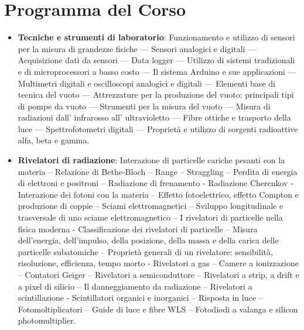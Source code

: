 \documentclass[12pt, letterpaper]{book}
\begin{document}
\chapter*{Programma del Corso}
\begin{itemize}
    \item[1] \textbf{Tecniche e strumenti di laboratorio}: Funzionamento e utilizzo di sensori per la misura di grandezze fisiche --- Sensori analogici e digitali --- Acquisizione dati da sensori --- Data logger --- Utilizzo di sistemi tradizionali e di microprocessori a basso costo --- Il sistema Arduino e sue applicazioni --- Multimetri digitali e oscilloscopi analogici e digitali --- Elementi base di tecnica del vuoto --- Attrezzature per la produzione del vuoto: principali tipi di pompe da vuoto --- Strumenti per la misura del vuoto --- Misura di radiazioni dall’ infrarosso all’ ultravioletto --- Fibre ottiche e trasporto della luce --- Spettrofotometri digitali --- Proprietà e utilizzo di sorgenti radioattive alfa, beta e gamma.
    
    \item[2] \textbf{Rivelatori di radiazione}: Interazione di particelle cariche pesanti con la materia – Relazione di Bethe-Bloch – Range – Straggling – Perdita di energia di elettroni e positroni – Radiazione di frenamento - Radiazione Cherenkov - Interazione dei fotoni con la materia – Effetto fotoelettrico, effetto Compton e produzione di coppie – Sciami elettromagnetici – Sviluppo longitudinale e trasversale di uno sciame elettromagnetico – I rivelatori di particelle nella fisica moderna - Classificazione dei rivelatori di particelle – Misura dell’energia, dell’impulso, della posizione, della massa e della carica delle particelle subatomiche – Proprietà generali di un rivelatore: sensibilità, risoluzione, efficienza, tempo morto - Rivelatori a gas – Camere a ionizzazione – Contatori Geiger – Rivelatori a semiconduttore – Rivelatori a strip, a drift e a pixel di silicio – Il danneggiamento da radiazione – Rivelatori a scintillazione - Scintillatori organici e inorganici – Risposta in luce – Fotomoltiplicatori – Guide di luce e fibre WLS – Fotodiodi a valanga e silicon photomultiplier.


\end{itemize}
\end{document}
